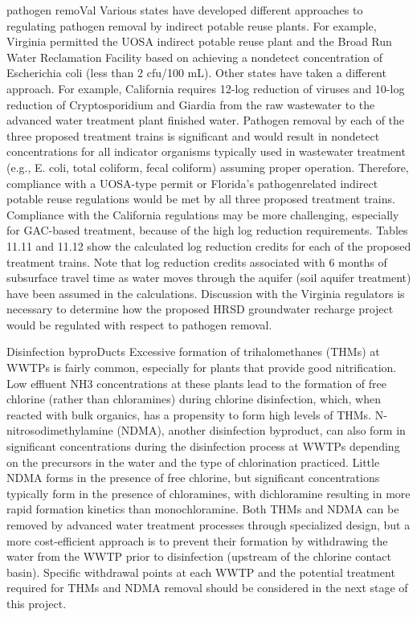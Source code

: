 \documentclass{article}
\begin{document}
pathogen remoVal Various states have developed different approaches to
regulating pathogen removal by indirect potable reuse plants. For
example, Virginia permitted the UOSA indirect potable reuse plant and
the Broad Run Water Reclamation Facility based on achieving a nondetect
concentration of Escherichia coli (less than 2 cfu/100 mL). Other states
have taken a different approach. For example, California requires 12-log
reduction of viruses and 10-log reduction of Cryptosporidium and Giardia
from the raw wastewater to the advanced water treatment plant finished
water. Pathogen removal by each of the three proposed treatment trains
is significant and would result in nondetect concentrations for all
indicator organisms typically used in wastewater treatment (e.g., E.
coli, total coliform, fecal coliform) assuming proper operation.
Therefore, compliance with a UOSA-type permit or Florida's
pathogenrelated indirect potable reuse regulations would be met by all
three proposed treatment trains. Compliance with the California
regulations may be more challenging, especially for GAC-based treatment,
because of the high log reduction requirements. Tables 11.11 and 11.12
show the calculated log reduction credits for each of the proposed
treatment trains. Note that log reduction credits associated with 6
months of subsurface travel time as water moves through the aquifer
(soil aquifer treatment) have been assumed in the calculations.
Discussion with the Virginia regulators is necessary to determine how
the proposed HRSD groundwater recharge project would be regulated with
respect to pathogen removal.

Disinfection byproDucts Excessive formation of trihalomethanes (THMs) at
WWTPs is fairly common, especially for plants that provide good
nitrification. Low effluent NH3 concentrations at these plants lead to
the formation of free chlorine (rather than chloramines) during chlorine
disinfection, which, when reacted with bulk organics, has a propensity
to form high levels of THMs. N-nitrosodimethylamine (NDMA), another
disinfection byproduct, can also form in significant concentrations
during the disinfection process at WWTPs depending on the precursors in
the water and the type of chlorination practiced. Little NDMA forms in
the presence of free chlorine, but significant concentrations typically
form in the presence of chloramines, with dichloramine resulting in more
rapid formation kinetics than monochloramine. Both THMs and NDMA can be
removed by advanced water treatment processes through specialized
design, but a more cost-efficient approach is to prevent their formation
by withdrawing the water from the WWTP prior to disinfection (upstream
of the chlorine contact basin). Specific withdrawal points at each WWTP
and the potential treatment required for THMs and NDMA removal should be
considered in the next stage of this project.
\end{document}
